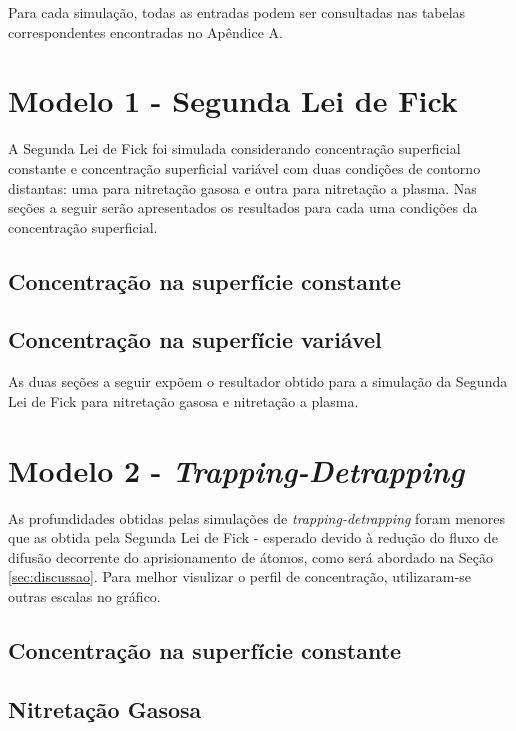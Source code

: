 \documentclass[]{politex}
\begin{document}
	Para cada simulação, todas as entradas podem ser consultadas nas tabelas correspondentes encontradas no Apêndice A.

\section{Modelo 1 - Segunda Lei de Fick}

A Segunda Lei de Fick foi simulada considerando concentração superficial constante e concentração superficial variável com duas condições de contorno distantas: uma para nitretação gasosa e outra para nitretação a plasma.
Nas seções a seguir serão apresentados os resultados para cada uma condições da concentração superficial.

\subsection{Concentração na superfície constante}
\label{sec:modelo11}


\subsection{Concentração na superfície variável}
As duas seções a seguir expõem o resultador obtido para a simulação da Segunda Lei de Fick para nitretação gasosa e nitretação a plasma.

\label{sec:modelo12}


\section{Modelo 2 - \textit{Trapping-Detrapping}}
\label{sec:modelo2}
As profundidades obtidas pelas simulações de \textit{trapping-detrapping} foram menores que as obtida pela Segunda Lei de Fick - esperado devido à redução do fluxo de difusão decorrente do aprisionamento de átomos, como será abordado na Seção \ref{sec:discussao}. Para melhor visulizar o perfil de concentração, utilizaram-se outras escalas no gráfico. 

\subsection{Concentração na superfície constante}
\label{sec:modelo21}


\subsection{Nitretação Gasosa}
\label{sec:modelo22}

\end{document}
